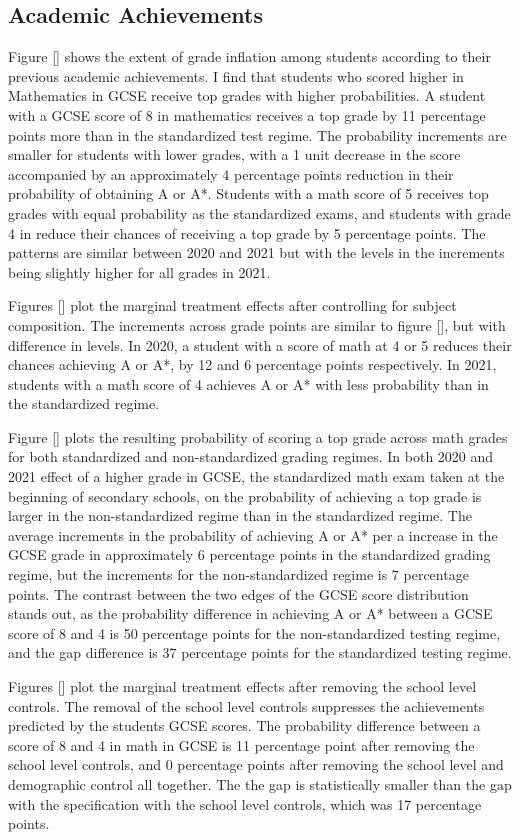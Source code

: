 \subsection{Academic Achievements}
Figure [] shows the extent of grade inflation among students according to their previous academic achievements. I find that students who scored higher in Mathematics in GCSE receive top grades with higher probabilities. A student with a GCSE score of 8 in mathematics receives a top grade by 11 percentage points more than in the standardized test regime. The probability increments are smaller for students with lower grades, with a 1 unit decrease in the score accompanied by an approximately 4 percentage points reduction in their probability of obtaining A or A*. Students with a math score of 5 receives top grades with equal probability as the standardized exams, and students with grade 4 in reduce their chances of receiving a top grade by 5 percentage points. The patterns are similar between 2020 and 2021 but with the levels in the increments being slightly higher for all grades in 2021. 

Figures [] plot the marginal treatment effects after controlling for subject composition. The increments across grade points are similar to figure [], but with difference in levels. In 2020, a student with a score of math at 4 or 5 reduces their chances achieving A or A*, by 12 and 6 percentage points respectively. In 2021, students with a math score of 4 achieves A or A* with less probability than in the standardized regime.

Figure [] plots the resulting probability of scoring a top grade across math grades for both standardized and non-standardized grading regimes. In both 2020 and 2021 effect of a higher grade in GCSE, the standardized math exam taken at the beginning of secondary schools, on the probability of achieving a top grade is larger in the non-standardized regime than in the standardized regime. The average increments in the probability of achieving A or A* per a increase in the GCSE grade in approximately 6 percentage points in the standardized grading regime, but the increments for the non-standardized regime is 7 percentage points. The contrast between the two edges of the GCSE score distribution stands out, as the probability difference in achieving A or A* between a GCSE score of 8 and 4 is 50 percentage points for the non-standardized testing regime, and the gap difference is 37 percentage points for the standardized testing regime.

Figures [] plot the marginal treatment effects after removing the school level controls. The removal of the school level controls suppresses the achievements predicted by the students GCSE scores. The probability difference between a score of 8 and 4 in math in GCSE is 11 percentage point after removing the school level controls, and 0 percentage points after removing the school level and demographic control all together. The the gap is statistically smaller than the gap with the specification with the school level controls, which was 17 percentage points.

